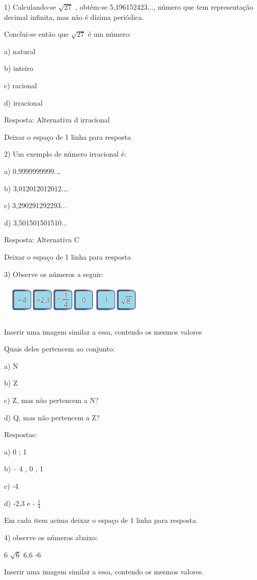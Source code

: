 
1) Calculando-se \(\sqrt{27}\) , obtém-se 5,196152423..., número que tem
representação decimal infinita, mas não é dízima periódica.

Conclui-se então que \(\sqrt{27}\) é um número:

a) natural

b) inteiro

c) racional

d) irracional

Resposta: Alternativa d irracional

Deixar o espaço de 1 linha para resposta

2) Um exemplo de número irracional é:

a) 0,9999999999.\ldots{}

b) 3,012012012012.\ldots{}

c) 3,290291292293...

d) 3,501501501510...

Resposta: Alternativa C

Deixar o espaço de 1 linha para resposta

3) Observe os números a seguir:

\includegraphics[width=2.79167in,height=0.63542in]{./imgSAEB_8_MAT/media/image1.png}

Inserir uma imagem similar a essa, contendo os mesmos valores

Quais deles pertencem ao conjunto:

a) N

b) Z

c) Z, mas não pertencem a N?

d) Q, mas não pertencem a Z?

Respostas:

a) 0 ; 1

b) -- 4 , 0 , 1

c) -4

d) -2,3 e - \(\frac{1}{4}\)

Em cada item acima deixar o espaço de 1 linha para resposta.

4) observe os números abaixo:

6 \(\sqrt{6}\) 6,6 -6

Inserir uma imagem similar a essa, contendo os mesmos valores.

